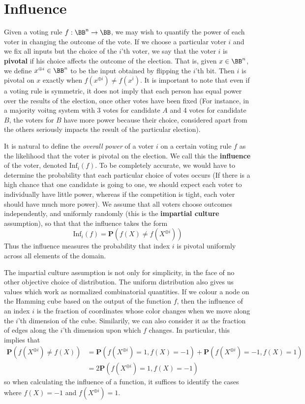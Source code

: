 \section{Influence}

Given a voting rule $f: \BB^n \to \BB$, we may wish to quantify the power of each voter in changing the outcome of the vote. If we choose a particular voter $i$ and we fix all inputs but the choice of the $i$'th voter, we say that the voter $i$ is {\bf pivotal} if his choice affects the outcome of the election. That is, given $x \in \BB^n$, we define $x^{\oplus i} \in \BB^n$ to be the input obtained by flipping the $i$'th bit. Then $i$ is pivotal on $x$ exactly when $f(x^{\oplus i}) \neq f(x^i)$. It is important to note that even if a voting rule is symmetric, it does not imply that each person has equal power over the results of the election, once other votes have been fixed (For instance, in a majority voitng system with 3 votes for candidate $A$ and 4 votes for candidate $B$, the voters for $B$ have more power because their choice, considered apart from the others seriously impacts the result of the particular election).

It is natural to define the {\it overall power} of a voter $i$ on a certain voting rule $f$ as the likelihood that the voter is pivotal on the election. We call this the {\bf influence} of the voter, denoted $\text{Inf}_i(f)$. To be completely accurate, we would have to determine the probability that each particular choice of votes occurs (If there is a high chance that one candidate is going to one, we should expect each voter to individually have little power, whereas if the competition is tight, each voter should have much more power). We assume that all voters choose outcomes independently, and uniformly randomly (this is the {\bf impartial culture} assumption), so that that the influence takes the form
%
\[ \text{Inf}_i(f) = \mathbf{P}(f(X) \neq f(X^{\oplus i})) \]
%
Thus the influence measures the probability that index $i$ is pivotal uniformly across all elements of the domain.

The impartial culture assumption is not only for simplicity, in the face of no other objective choice of distribution. The uniform distribution also gives us values which work as normalized combinatorial quantities. If we colour a node on the Hamming cube based on the output of the function $f$, then the influence of an index $i$ is the fraction of coordinates whose color changes when we move along the $i$'th dimension of the cube. Similarily, we can also consider it as the fraction of edges along the $i$'th dimension upon which $f$ changes. In particular, this implies that
%
\begin{align*}
    \mathbf{P}(f(X^{\oplus i}) \neq f(X)) &= \mathbf{P}(f(X^{\oplus i}) = 1, f(X) = -1) + \mathbf{P}(f(X^{\oplus i}) = -1, f(X) = 1)\\
    &= 2 \mathbf{P}(f(X^{\oplus i}) = 1, f(X) = -1)
\end{align*}
%
so when calculating the influence of a function, it suffices to identify the cases where $f(X) = -1$ and $f(X^{\oplus i}) = 1$.

